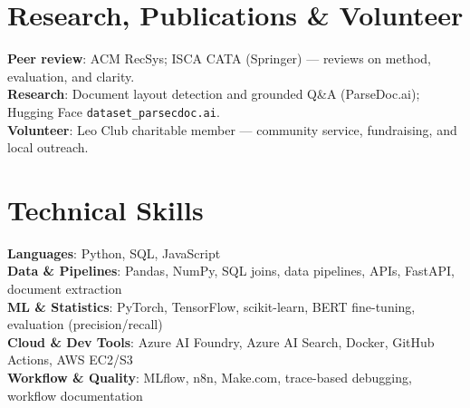 \documentclass[letterpaper,11pt]{article}
\begin{document}
\section{Research, Publications \& Volunteer}
 \begin{itemize}[leftmargin=0.15in, label={}, topsep=1pt]
    \small{\item{
     \textbf{Peer review}{: ACM RecSys; ISCA CATA (Springer) --- reviews on method, evaluation, and clarity.} \\
     \textbf{Research}{: Document layout detection and grounded Q\&A (ParseDoc.ai); Hugging Face \texttt{dataset\_parsecdoc.ai}.} \\
     \textbf{Volunteer}{: Leo Club charitable member --- community service, fundraising, and local outreach.}
    }}
 \end{itemize}

\section{Technical Skills}
 \begin{itemize}[leftmargin=0.15in, label={}]
    \small{\item{
     \textbf{Languages}{: Python, SQL, JavaScript} \\
     \textbf{Data \& Pipelines}{: Pandas, NumPy, SQL joins, data pipelines, APIs, FastAPI, document extraction} \\
     \textbf{ML \& Statistics}{: PyTorch, TensorFlow, scikit-learn, BERT fine-tuning, evaluation (precision/recall)} \\
     \textbf{Cloud \& Dev Tools}{: Azure AI Foundry, Azure AI Search, Docker, GitHub Actions, AWS EC2/S3} \\
     \textbf{Workflow \& Quality}{: MLflow, n8n, Make.com, trace-based debugging, workflow documentation}

    }}
 \end{itemize}
\end{document}
